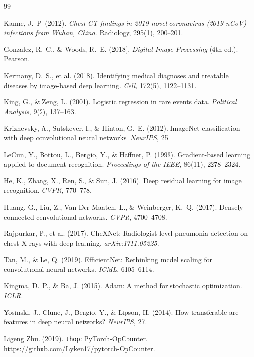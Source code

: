 \documentclass[11pt,a4paper]{article}
\begin{document}
\newpage

\begin{thebibliography}{99}

Kanne, J.~P. (2012).
\textit{Chest CT findings in 2019 novel coronavirus (2019-nCoV) infections from Wuhan, China}.
Radiology, 295(1), 200--201.

Gonzalez, R.~C., \& Woods, R.~E. (2018).
\textit{Digital Image Processing} (4th ed.).
Pearson.

Kermany, D.~S., et al. (2018).
Identifying medical diagnoses and treatable diseases by image-based deep learning.
\textit{Cell}, 172(5), 1122--1131.

King, G., \& Zeng, L. (2001).
Logistic regression in rare events data.
\textit{Political Analysis}, 9(2), 137--163.

Krizhevsky, A., Sutskever, I., \& Hinton, G.~E. (2012).
ImageNet classification with deep convolutional neural networks.
\textit{NeurIPS}, 25.

LeCun, Y., Bottou, L., Bengio, Y., \& Haffner, P. (1998).
Gradient-based learning applied to document recognition.
\textit{Proceedings of the IEEE}, 86(11), 2278--2324.

He, K., Zhang, X., Ren, S., \& Sun, J. (2016).
Deep residual learning for image recognition.
\textit{CVPR}, 770--778.

Huang, G., Liu, Z., Van Der Maaten, L., \& Weinberger, K.~Q. (2017).
Densely connected convolutional networks.
\textit{CVPR}, 4700--4708.

Rajpurkar, P., et al. (2017).
CheXNet: Radiologist-level pneumonia detection on chest X-rays with deep learning.
\textit{arXiv:1711.05225}.

Tan, M., \& Le, Q. (2019).
EfficientNet: Rethinking model scaling for convolutional neural networks.
\textit{ICML}, 6105--6114.

Kingma, D.~P., \& Ba, J. (2015).
Adam: A method for stochastic optimization.
\textit{ICLR}.

Yosinski, J., Clune, J., Bengio, Y., \& Lipson, H. (2014).
How transferable are features in deep neural networks?
\textit{NeurIPS}, 27.

Ligeng Zhu. (2019).
\texttt{thop}: PyTorch-OpCounter.
\url{https://github.com/Lyken17/pytorch-OpCounter}.

\end{thebibliography}
\end{document}
